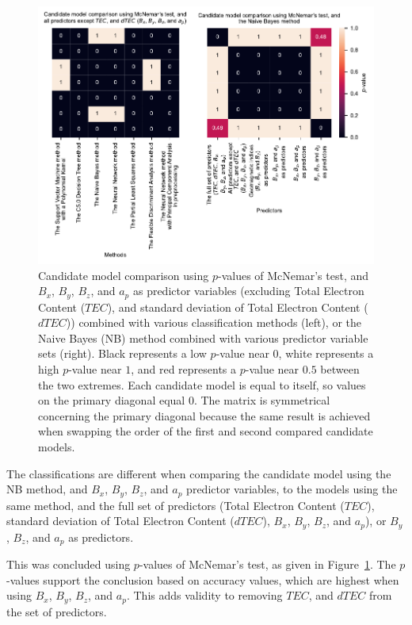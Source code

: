 \let\LaTeXcline\cline\documentclass[sn-mathphys-num]{sn-jnl}\let\cline\LaTeXcline
\begin{document}
\begin{figure}[!ht]
 \centering
    \includegraphics[width=\linewidth]{pvalueplot_total_horizontal.pdf}
    \caption{Candidate model comparison using $p$-values of McNemar's test, and $B_{x}$, $B_{y}$, $B_{z}$, and $a_{p}$ as predictor variables (excluding Total Electron Content ($TEC$), and standard deviation of Total Electron Content ($dTEC$)) combined with various classification methods (left), or the Naive Bayes (NB) method combined with various predictor variable sets (right). Black represents a low $p$-value near $0$, white represents a high $p$-value near $1$, and red represents a $p$-value near $0.5$ between the two extremes. Each candidate model is equal to itself, so values on the primary diagonal equal $0$. The matrix is symmetrical concerning the primary diagonal because the same result is achieved when swapping the order of the first and second compared candidate models.}
    \label{fig:pvalueplot}
\end{figure}

The classifications are different when comparing the candidate model using the NB method, and $B_{x}$, $B_{y}$, $B_{z}$, and $a_{p}$ predictor variables, to the models using the same method, and the full set of predictors (Total Electron Content ($TEC$), standard deviation of Total Electron Content ($dTEC$), $B_{x}$, $B_{y}$, $B_{z}$, and $a_{p}$), or $B_{y}$, $B_{z}$, and $a_{p}$ as predictors.

This was concluded using $p$-values of McNemar's test, as given in Figure~\ref{fig:pvalueplot}. The $p$-values support the conclusion based on accuracy values, which are highest when using $B_{x}$, $B_{y}$, $B_{z}$, and $a_{p}$. This adds validity to removing $TEC$, and $dTEC$ from the set of predictors.
\end{document}
